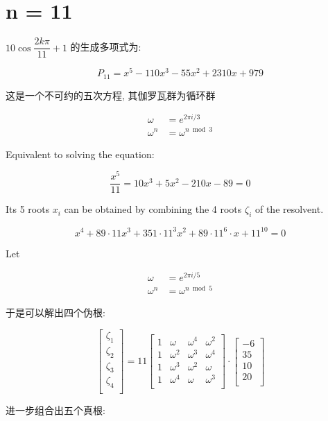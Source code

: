 \chapter{n = 11}\label{ch:cos11}

$10\cos\dfrac{2kπ}{11}+1$ 的生成多项式为:

$$
P_{11} = x^5-110 x^3-55 x^2+2310 x+979
$$

这是一个不可约的五次方程, 其伽罗瓦群为循环群

$$
\begin{aligned}
ω&= e^{2πi/3}\\
ω^n&=ω^{n\bmod 3}
\end{aligned}
$$


Equivalent to solving the equation:

$$\frac{x^5}{11}=10x^3+5x^2-210x-89=0$$

Its 5 roots $x_i$ can be obtained by combining the 4 roots $ζ_i$ of the resolvent.

$$
x^4+89⋅11x^3+351⋅11^3x^2+89⋅11^6⋅x+11^{10}=0
$$

Let 

$$
\begin{aligned}
ω&= e^{2πi/5}\\
ω^n&=ω^{n\bmod 5} 
\end{aligned}
$$

于是可以解出四个伪根:

$$
\begin{bmatrix}
ζ_1\\ζ_2\\ζ_3\\ζ_4\\
\end{bmatrix}=
11\begin{bmatrix}
1 & ω   & ω^4 & ω^2 \\
1 & ω^2 & ω^3 & ω^4 \\
1 & ω^3 & ω^2 & ω \\
1 & ω^4 & ω   & ω^3 \\
\end{bmatrix}⋅
\begin{bmatrix}
-6\\35\\10\\20\\
\end{bmatrix}
$$

进一步组合出五个真根:

